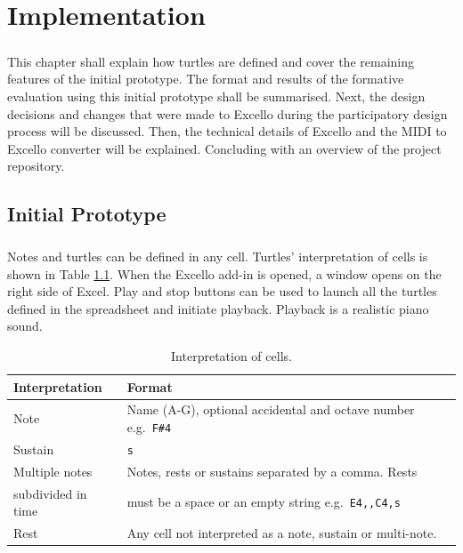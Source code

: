 
\chapter{Implementation}

\paragraph{} This chapter shall explain how turtles are defined and cover the remaining features of the initial prototype. The format and results of the formative evaluation using this initial prototype shall be summarised. Next, the design decisions and changes that were made to Excello during the participatory design process will be discussed. Then, the technical details of Excello and the MIDI to Excello converter will be explained. Concluding with an overview of the project repository.

\section{Initial Prototype}

\paragraph{} Notes and turtles can be defined in any cell. Turtles' interpretation of cells is shown in Table \ref{tab:cells}. When the Excello add-in is opened, a window opens on the right side of Excel. Play and stop buttons can be used to launch all the turtles defined in the spreadsheet and initiate playback. Playback is a realistic piano sound.

\begin{table}[htb]
\centering
\vspace{1pt}
\begin{tabular}{|l|l|} \hline
\textbf{Interpretation}&\textbf{Format}\\ \hline
Note& Name (A-G), optional accidental and octave number e.g.~\texttt{F\#4}\\ \hline
Sustain& \texttt{s}\\ \hline
Multiple notes& Notes, rests or sustains separated by a comma. Rests \\
subdivided in time& must be a space or an empty string e.g.~\texttt{E4,,C4,s}\\ \hline
Rest& Any cell not interpreted as a note, sustain or multi-note. \\ \hline
\end{tabular}
\caption{Interpretation of cells.\label{tab:cells}}
\end{table}

